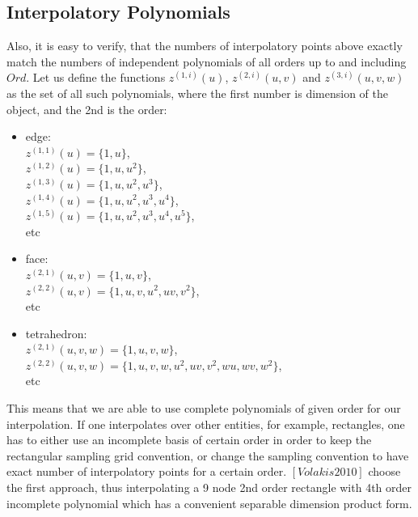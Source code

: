 \subsection{Interpolatory Polynomials}
\label{section-interppoly}

\noindent
Also, it is easy to verify, that the numbers of interpolatory points above exactly match the numbers of independent polynomials of all orders up to and including $Ord$. Let us define the functions $z^{(1,i)}(u)$, $z^{(2,i)}(u,v)$ and $z^{(3,i)}(u,v,w)$ as the set of all such polynomials, where the first number is dimension of the object, and the 2nd is the order:
\begin{itemize}
	\item edge: \\
		$z^{(1,1)}(u) = \{1, u\}$, \\
		$z^{(1,2)}(u) = \{1, u, u^2\}$, \\
		$z^{(1,3)}(u) = \{1, u, u^2, u^3\}$, \\
		$z^{(1,4)}(u) = \{1, u, u^2, u^3, u^4\}$, \\
		$z^{(1,5)}(u) = \{1, u, u^2, u^3, u^4, u^5\}$, \\
		etc
	\item face:	\\
		$z^{(2,1)}(u,v)	= \{1, u, v\}$, \\
		$z^{(2,2)}(u,v) = \{1, u, v, u^2, uv, v^2\}$, \\
		etc
	\item tetrahedron: \\
		$z^{(2,1)}(u,v,w) = \{1, u, v, w\}$, \\ 
		$z^{(2,2)}(u,v,w) = \{1, u, v, w, u^2, uv, v^2, wu, wv, w^2\}$, \\
		etc
\end{itemize}

\noindent
This means that we are able to use complete polynomials of given order for our interpolation. If one interpolates over other entities, for example, rectangles, one has to either use an incomplete basis of certain order in order to keep the rectangular sampling grid convention, or change the sampling convention to have exact number of interpolatory points for a certain order. $[Volakis2010]$ choose the first approach, thus interpolating a 9 node 2nd order rectangle with 4th order incomplete polynomial which has a convenient separable dimension product form. \\

